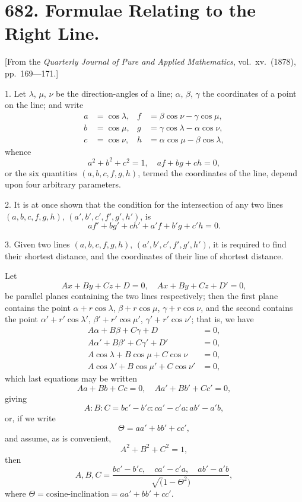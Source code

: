 \documentclass[11pt,a4paper]{book}
\begin{document}
\newpage

\section*{682. Formulae Relating to the Right Line.}

[From the \textit{Quarterly Journal of Pure and Applied Mathematics}, vol.\ xv.\ (1878), pp.\ 169---171.]

1. Let $\lambda$, $\mu$, $\nu$ be the direction-angles of a line; $\alpha$, $\beta$, $\gamma$ the coordinates of a point on the line; and write
\begin{align*}
a &= \cos \lambda, & f &= \beta \cos \nu - \gamma \cos \mu, \\
b &= \cos \mu, & g &= \gamma \cos \lambda - \alpha \cos \nu, \\
c &= \cos \nu, & h &= \alpha \cos \mu - \beta \cos \lambda,
\end{align*}
whence
\[
a^2 + b^2 + c^2 = 1, \quad af + bg + ch = 0,
\]
or the six quantities $(a, b, c, f, g, h)$, termed the coordinates of the line, depend upon four arbitrary parameters.

2. It is at once shown that the condition for the intersection of any two lines $(a, b, c, f, g, h)$, $(a', b', c', f', g', h')$, is
\[
af' + bg' + ch' + a'f + b'g + c'h = 0.
\]

3. Given two lines $(a, b, c, f, g, h)$, $(a', b', c', f', g', h')$, it is required to find their shortest distance, and the coordinates of their line of shortest distance.

Let
\[
Ax + By + Cz + D = 0, \quad Ax + By + Cz + D' = 0,
\]
be parallel planes containing the two lines respectively; then the first plane contains the point $\alpha + r\cos\lambda$, $\beta + r\cos\mu$, $\gamma + r\cos\nu$, and the second contains the point $\alpha' + r'\cos\lambda'$, $\beta' + r'\cos\mu'$, $\gamma' + r'\cos\nu'$; that is, we have
\begin{align*}
A\alpha + B\beta + C\gamma + D &= 0, \\
A\alpha' + B\beta' + C\gamma' + D' &= 0, \\
A\cos\lambda + B\cos\mu + C\cos\nu &= 0, \\
A\cos\lambda' + B\cos\mu' + C\cos\nu' &= 0,
\end{align*}
which last equations may be written
\[
Aa + Bb + Cc = 0, \quad Aa' + Bb' + Cc' = 0,
\]
giving
\[
A : B : C = bc' - b'c : ca' - c'a : ab' - a'b,
\]
or, if we write
\[
\Theta = aa' + bb' + cc',
\]
and assume, as is convenient,
\[
A^2 + B^2 + C^2 = 1,
\]
then
\[
A, B, C = \frac{bc' - b'c, \quad ca' - c'a, \quad ab' - a'b}{\surd(1 - \Theta^2)},
\]
where $\Theta = \text{cosine-inclination} = aa' + bb' + cc'$.
\end{document}
